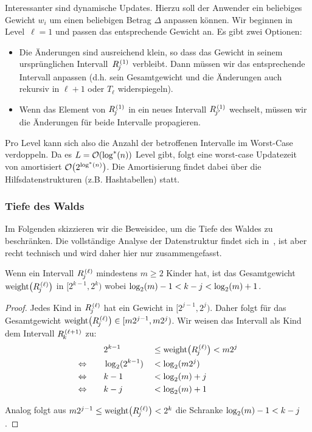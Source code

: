 Interessanter sind dynamische Updates.
Hierzu soll der Anwender ein beliebiges Gewicht $w_i$ um einen beliebigen Betrag $\Delta$ anpassen können.
Wir beginnen in Level~$\ell=1$ und passen das entsprechende Gewicht an.
Es gibt zwei Optionen:
\begin{itemize}
    \item Die Änderungen sind ausreichend klein, so dass das Gewicht in seinem ursprünglichen Intervall~$\rng{1}{j}$ verbleibt.
          Dann müssen wir das entsprechende Intervall anpassen (d.h. sein Gesamtgewicht und die Änderungen auch rekursiv in $\ell +1$ oder $T_\ell$ widerspiegeln).


    \item Wenn das Element von $\rng{1}{j}$ in ein neues Intervall $\rng{1}{j'}$ wechselt, müssen wir die Änderungen für beide Intervalle propagieren.
\end{itemize}

Pro Level kann sich also die Anzahl der betroffenen Intervalle im Worst-Case verdoppeln.
Da es $L = \mathcal{O}\!\left(\log^*(n)\right)$ Level gibt, folgt eine worst-case Updatezeit von amortisiert $\mathcal{O}\!\left(2^{\log^*(n)}\right)$.
Die Amortisierung findet dabei über die Hilfsdatenstrukturen (z.B. Hashtabellen) statt.

\subsubsection{Tiefe des Walds}
Im Folgenden skizzieren wir die Beweisidee, um die Tiefe des Waldes zu beschränken.
Die vollständige Analyse der Datenstruktur findet sich in~\cite{DBLP:journals/mst/MatiasVN03}, ist aber recht technisch und wird daher hier nur zusammengefasst.

\begin{lemma}\label{lem:nachfolger_intervall}
    Wenn ein Intervall $\rng{\ell}{j}$ mindestens $m \ge 2$ Kinder hat,
    ist das Gesamtgewicht $\wrng{\ell}{j}$ in $[2^{k-1}, 2^k)$ wobei $\log_2(m) - 1 < k - j < \log_2(m) + 1$.
\end{lemma}
\begin{proof}
    Jedes Kind in $\rng{\ell}{j}$ hat ein Gewicht in $[2^{j-1}, 2^j)$.
    Daher folgt für das Gesamtgewicht $\wrng{\ell}{j} \in [m2^{j-1}, m2^j)$.
    Wir weisen das Intervall als Kind dem Intervall $\rng{\ell+1}{k}$ zu:
    \begin{align}
                               & 2^{k-1}      && \le \wrng{\ell}{j} < m2^j \\
        \Leftrightarrow \qquad & \ld(2^{k-1}) && < \ld(m2^{j})             \\
        \Leftrightarrow \qquad & k - 1        && < \ld(m) + j              \\
        \Leftrightarrow \qquad & k - j        && < \ld(m) + 1
    \end{align}

    \noindent
    Analog folgt aus $m2^{j-1} \le \wrng{\ell}{j} < 2^k$ die Schranke $\log_2(m) - 1 < k - j$.
\end{proof}

